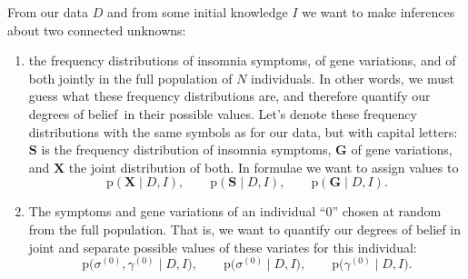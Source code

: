 \documentclass[\ifafour a4paper,12pt,\else a5paper,10pt,\fi%
onecolumn,oneside,article,%
british%
]{memoir}
\theoremstyle{remark}
\theoremstyle{innote}
\newcommand*{\pf}{\mathrm{p}}%
\renewcommand*{\|}{\mathpunct{|}}
\newcommand*{\dobs}{degrees of belief}
\newcommand*{\yD}{D}
\newcommand*{\yI}{I}
\newcommand*{\ys}{\sigma}
\newcommand*{\yg}{\gamma}
\newcommand*{\ysi}[1]{\ys^{(#1)}}
\newcommand*{\ygi}[1]{\yg^{(#1)}}
\newcommand*{\yso}{\ysi{0}}
\newcommand*{\ygo}{\ygi{0}}
\newcommand*{\yFs}{\bm{S}}
\newcommand*{\yFg}{\bm{G}}
\newcommand*{\yF}{\bm{X}}
\begin{document}
From our data $\yD$ and from some initial knowledge $\yI$ we want to make
inferences about two connected unknowns:
\begin{enumerate}[label=(\alph*)]
\item the frequency distributions of insomnia symptoms, of gene variations,
  and of both jointly in the full population of $N$ individuals. In other
  words, we must guess what these frequency distributions are, and
  therefore quantify our \dobs\ in their
  possible values. Let's denote these frequency distributions with the same
  symbols as for our data, but with capital letters: $\yFs$ is the
  frequency distribution of insomnia symptoms, $\yFg$ of gene variations,
  and $\yF$ the joint distribution of both. In formulae we want to assign
  values to
  \begin{equation}
    \label{eq:goal_plausibilities}
    \pf(\yF \| \yD,\yI),\qquad
    \pf(\yFs \| \yD,\yI),\qquad
    \pf(\yFg \| \yD,\yI).
  \end{equation}
\item The symptoms and gene variations of an individual \enquote{$0$}
  chosen at random from the full population. That is, we want to quantify
  our degrees of belief in joint and separate possible values of these
  variates for this individual:
  \begin{equation}
    \label{eq:goal_ind_plausibilities}
    \pf\bigl( \ysi{0}, \ygi{0} \| \yD, \yI \bigr),\qquad
    \pf\bigl( \ysi{0} \| \yD, \yI \bigr),\qquad
    \pf\bigl(  \ygi{0} \| \yD, \yI \bigr).
  \end{equation}
\end{enumerate}



\end{document}
